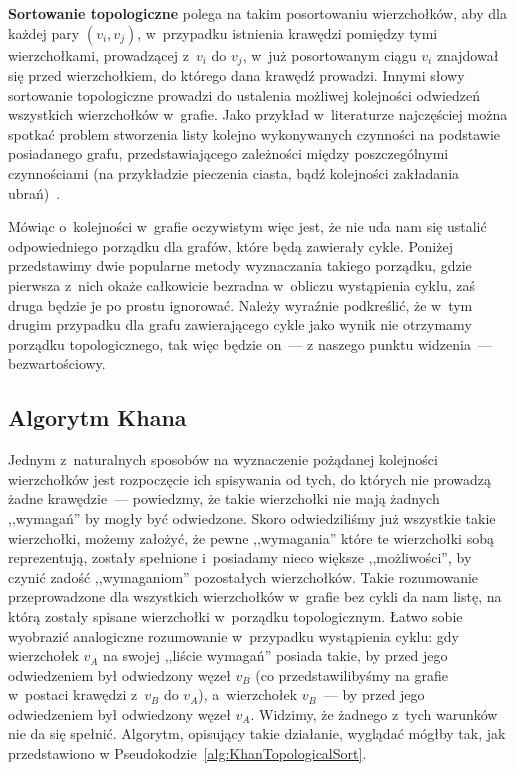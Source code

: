 \textbf{Sortowanie topologiczne} polega na takim posortowaniu wierzchołków, aby dla każdej pary $\left( v_{i}, v_{j} \right)$, w~przypadku istnienia krawędzi pomiędzy tymi wierzchołkami, prowadzącej z~$v_{i}$ do $v_{j}$, w~już posortowanym ciągu $v_{i}$ znajdował się przed wierzchołkiem, do którego dana krawędź prowadzi.
Innymi słowy sortowanie topologiczne prowadzi do ustalenia możliwej kolejności odwiedzeń wszystkich wierzchołków w~grafie.
Jako przykład w~literaturze najczęściej można spotkać problem stworzenia listy kolejno wykonywanych czynności na podstawie posiadanego grafu, przedstawiającego zależności między poszczególnymi czynnościami (na przykładzie pieczenia ciasta, bądź kolejności zakładania ubrań)~\cite[$22.4$]{Cormen}. 

Mówiąc o~kolejności w~grafie oczywistym więc jest, że nie uda nam się ustalić odpowiedniego porządku dla grafów, które będą zawierały cykle.
Poniżej przedstawimy dwie popularne metody wyznaczania takiego porządku, gdzie pierwsza z~nich okaże całkowicie bezradna w~obliczu wystąpienia cyklu, zaś druga będzie je po prostu ignorować.
Należy wyraźnie podkreślić, że w~tym drugim przypadku dla grafu zawierającego cykle jako wynik nie otrzymamy porządku topologicznego, tak więc będzie on~--- z naszego punktu widzenia~--- bezwartościowy.



\subsection{Algorytm Khana}



Jednym z~naturalnych sposobów na wyznaczenie pożądanej kolejności wierzchołków jest rozpoczęcie ich spisywania od tych, do których nie prowadzą żadne krawędzie~--- powiedzmy, że takie wierzchołki nie mają żadnych ,,wymagań'' by mogły być odwiedzone.
Skoro odwiedziliśmy już wszystkie takie wierzchołki, możemy założyć, że pewne ,,wymagania'' które te wierzchołki sobą reprezentują, zostały spełnione i~posiadamy nieco większe ,,możliwości'', by czynić zadość ,,wymaganiom'' pozostałych wierzchołków.
Takie rozumowanie przeprowadzone dla wszystkich wierzchołków w~grafie bez cykli da nam listę, na którą zostały spisane wierzchołki w~porządku topologicznym.
Łatwo sobie wyobrazić analogiczne rozumowanie w~przypadku wystąpienia cyklu: gdy wierzchołek $v_{A}$ na swojej ,,liście wymagań'' posiada takie, by przed jego odwiedzeniem był odwiedzony węzeł $v_{B}$ (co przedstawilibyśmy na grafie w~postaci krawędzi z~$v_{B}$ do $v_{A}$), a~wierzchołek $v_{B}$~--- by przed jego odwiedzeniem był odwiedzony węzeł $v_{A}$.
Widzimy, że żadnego z~tych warunków nie da się spełnić.
Algorytm, opisujący takie działanie, wyglądać mógłby tak, jak przedstawiono w Pseudokodzie~\ref{alg:KhanTopologicalSort}.

